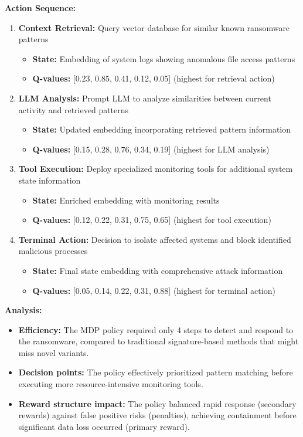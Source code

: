 \documentclass[10pt,journal,compsoc]{IEEEtran}
\begin{document}
\textbf{Action Sequence:}
\begin{enumerate}
\item \textbf{Context Retrieval:} Query vector database for similar known ransomware patterns
   \begin{itemize}
   \item \textbf{State:} Embedding of system logs showing anomalous file access patterns
   \item \textbf{Q-values:} [0.23, 0.85, 0.41, 0.12, 0.05] (highest for retrieval action)
   \end{itemize}
   
\item \textbf{LLM Analysis:} Prompt LLM to analyze similarities between current activity and retrieved patterns
   \begin{itemize}
   \item \textbf{State:} Updated embedding incorporating retrieved pattern information
   \item \textbf{Q-values:} [0.15, 0.28, 0.76, 0.34, 0.19] (highest for LLM analysis)
   \end{itemize}
   
\item \textbf{Tool Execution:} Deploy specialized monitoring tools for additional system state information
   \begin{itemize}
   \item \textbf{State:} Enriched embedding with monitoring results
   \item \textbf{Q-values:} [0.12, 0.22, 0.31, 0.75, 0.65] (highest for tool execution)
   \end{itemize}
   
\item \textbf{Terminal Action:} Decision to isolate affected systems and block identified malicious processes
   \begin{itemize}
   \item \textbf{State:} Final state embedding with comprehensive attack information
   \item \textbf{Q-values:} [0.05, 0.14, 0.22, 0.31, 0.88] (highest for terminal action)
   \end{itemize}
\end{enumerate}

\textbf{Analysis:}
\begin{itemize}
\item \textbf{Efficiency:} The MDP policy required only 4 steps to detect and respond to the ransomware, compared to traditional signature-based methods that might miss novel variants.
\item \textbf{Decision points:} The policy effectively prioritized pattern matching before executing more resource-intensive monitoring tools.
\item \textbf{Reward structure impact:} The policy balanced rapid response (secondary rewards) against false positive risks (penalties), achieving containment before significant data loss occurred (primary reward).
\end{itemize}
\end{document}

